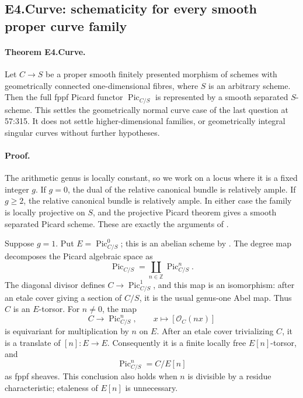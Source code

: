 
\subsection*{E4.Curve: schematicity for every smooth proper curve family}

\paragraph{Theorem E4.Curve.}
Let $C\to S$ be a proper smooth finitely presented morphism of schemes
with geometrically connected one-dimensional fibres, where $S$ is an
arbitrary scheme. Then the full fppf Picard functor $\operatorname{Pic}_{C/S}$
is represented by a smooth separated $S$-scheme. This settles the
geometrically normal curve case of the last question at 57:315. It does
not settle higher-dimensional families, or geometrically integral
singular curves without further hypotheses.

\paragraph{Proof.}
The arithmetic genus is locally constant, so we work on a locus where
it is a fixed integer $g$. If $g=0$, the dual of the relative canonical
bundle is relatively ample. If $g\geq2$, the relative canonical bundle
is relatively ample. In either case the family is locally projective
on $S$, and the projective Picard theorem gives a smooth separated
Picard scheme. These are exactly the arguments of
\cite[\S9.3, Theorem~1 and Remark~2, p.~252]{BCEBLR1990}.

Suppose $g=1$. Put $E=\operatorname{Pic}^0_{C/S}$; this is an abelian
scheme by \cite[\S9.4, Proposition~4, p.~260]{BCEBLR1990}.
The degree map decomposes the Picard algebraic space as
\[
 \operatorname{Pic}_{C/S}=\coprod_{n\in\mathbb Z}\operatorname{Pic}^n_{C/S}.
\]
The diagonal divisor defines $C\to\operatorname{Pic}^1_{C/S}$, and
this map is an isomorphism: after an etale cover giving a section of
$C/S$, it is the usual genus-one Abel map. Thus $C$ is an $E$-torsor.
For $n\neq0$, the map
\[
 C\longrightarrow\operatorname{Pic}^n_{C/S},\qquad
        x\longmapsto[\mathcal O_C(nx)]                  \tag{E4.Curve.1}
\]
is equivariant for multiplication by $n$ on $E$. After an etale
cover trivializing $C$, it is a translate of $[n]:E\to E$.
Consequently it is a finite locally free $E[n]$-torsor, and
\[
        \operatorname{Pic}^n_{C/S}=C/E[n]               \tag{E4.Curve.2}
\]
as fppf sheaves. This conclusion also holds when $n$ is divisible by
a residue characteristic; etaleness of $E[n]$ is unnecessary.

